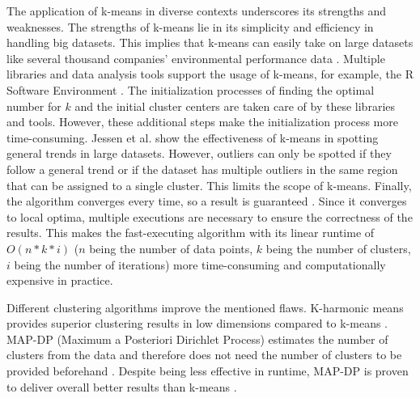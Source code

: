 The application of k-means in diverse contexts underscores its strengths and weaknesses.
The strengths of k-means lie in its simplicity and efficiency in handling big datasets.
This implies that k-means can easily take on large datasets like several thousand companies' environmental performance data \cite{LIU-BDE}.
Multiple libraries and data analysis tools support the usage of k-means, for example, the R Software Environment \cite{R-SOF}.
The initialization processes of finding the optimal number for $k$ and the initial cluster centers are taken care of by these libraries and tools.
However, these additional steps make the initialization process more time-consuming.
Jessen et al. \cite{JES-IND} show the effectiveness of k-means in spotting general trends in large datasets.
However, outliers can only be spotted if they follow a general trend or if the dataset has multiple outliers in the same region that can be assigned to a single cluster.
This limits the scope of k-means.
Finally, the algorithm converges every time, so a result is guaranteed \cite{SEL-GCT}.
Since it converges to local optima, multiple executions are necessary to ensure the correctness of the results.
This makes the fast-executing algorithm with its linear runtime of $O(n * k * i)$ ($n$ being the number of data points, $k$ being the number of clusters, $i$ being the number of iterations) more time-consuming and computationally expensive in practice.

Different clustering algorithms improve the mentioned flaws.
K-harmonic means provides superior clustering results in low dimensions compared to k-means \cite{HAM-ALT}.
MAP-DP (Maximum a Posteriori Dirichlet Process) estimates the number of clusters from the data and therefore does not need the number of clusters to be provided beforehand \cite{RAY-ALT}.
Despite being less effective in runtime, MAP-DP is proven to deliver overall better results than k-means \cite{RAY-ALT}.

